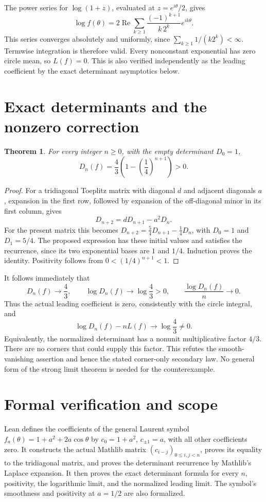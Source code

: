 \documentclass[11pt]{article}
\newtheorem{theorem}{Theorem}
\begin{document}
The power series for $\log(1+z)$, evaluated at
$z=e^{i\theta}/2$, gives
\[
 \log f(\theta)=
  2\operatorname{Re}\sum_{k\geq1}
      \frac{(-1)^{k+1}}{k\,2^k}e^{ik\theta}.
\]
This series converges absolutely and uniformly, since
$\sum_{k\geq1}1/(k2^k)<\infty$. Termwise integration is therefore valid.
Every nonconstant exponential has zero circle mean, so $L(f)=0$.
This is also verified independently as the leading coefficient by the
exact determinant asymptotics below.

\section*{Exact determinants and the nonzero correction}
\begin{theorem}
For every integer $n\geq0$, with the empty determinant $D_0=1$,
\[
 D_n(f)=\frac43\left(1-\left(\frac14\right)^{n+1}\right)>0.
\]
\end{theorem}
\begin{proof}
For a tridiagonal Toeplitz matrix with diagonal $d$ and adjacent
diagonals $a$, expansion in the first row, followed by expansion of
the off-diagonal minor in its first column, gives
\[
 D_{n+2}=dD_{n+1}-a^2D_n.
\]
For the present matrix this becomes
$D_{n+2}=\frac54D_{n+1}-\frac14D_n$, with $D_0=1$ and $D_1=5/4$.
The proposed expression has these initial values and satisfies the
recurrence, since its two exponential bases are $1$ and $1/4$.
Induction proves the identity. Positivity follows from
$0<(1/4)^{n+1}<1$.
\end{proof}

It follows immediately that
\[
 D_n(f)\longrightarrow\frac43,\qquad
 \log D_n(f)\longrightarrow\log\frac43>0,
 \qquad \frac{\log D_n(f)}n\longrightarrow0.
\]
Thus the actual leading coefficient is zero, consistently with the
circle integral, and
\[
 \log D_n(f)-nL(f)\longrightarrow\log\frac43\ne0.
\]
Equivalently, the normalized determinant has a nonunit multiplicative
factor $4/3$. There are no corners that could supply this factor.
This refutes the smooth-vanishing assertion and hence the stated
corner-only secondary law. No general form of the strong limit theorem
is needed for the counterexample.

\section*{Formal verification and scope}
Lean defines the coefficients of the general Laurent symbol
$f_a(\theta)=1+a^2+2a\cos\theta$ by
$c_0=1+a^2$, $c_{\pm1}=a$, with all other coefficients zero.
It constructs the actual Mathlib matrix
$(c_{i-j})_{0\leq i,j<n}$, proves its equality to the tridiagonal
matrix, and proves the determinant recurrence by Mathlib's Laplace
expansion. It then proves the exact determinant formula for every $n$,
positivity, the logarithmic limit, and the normalized leading limit.
The symbol's smoothness and positivity at $a=1/2$ are also formalized.
\end{document}
